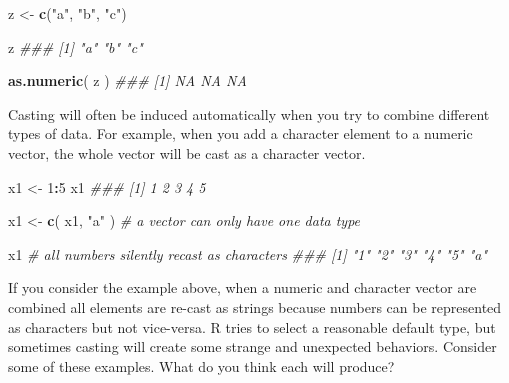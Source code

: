 \documentclass[]{book}
\newenvironment{Shaded}{\begin{snugshade}}{\end{snugshade}}
\newcommand{\CommentTok}[1]{\textcolor[rgb]{0.56,0.35,0.01}{\textit{#1}}}
\newcommand{\DecValTok}[1]{\textcolor[rgb]{0.00,0.00,0.81}{#1}}
\newcommand{\KeywordTok}[1]{\textcolor[rgb]{0.13,0.29,0.53}{\textbf{#1}}}
\newcommand{\NormalTok}[1]{#1}
\newcommand{\OperatorTok}[1]{\textcolor[rgb]{0.81,0.36,0.00}{\textbf{#1}}}
\newcommand{\StringTok}[1]{\textcolor[rgb]{0.31,0.60,0.02}{#1}}
\theoremstyle{definition}
\theoremstyle{definition}
\theoremstyle{definition}
\theoremstyle{remark}
\begin{document}
\begin{Shaded}
\begin{Highlighting}[]

\NormalTok{z <-}\StringTok{ }\KeywordTok{c}\NormalTok{(}\StringTok{"a"}\NormalTok{, }\StringTok{"b"}\NormalTok{, }\StringTok{"c"}\NormalTok{)}

\NormalTok{z}
\CommentTok{### [1] "a" "b" "c"}

\KeywordTok{as.numeric}\NormalTok{( z )}
\CommentTok{### [1] NA NA NA}
\end{Highlighting}
\end{Shaded}

Casting will often be induced automatically when you try to combine
different types of data. For example, when you add a character element
to a numeric vector, the whole vector will be cast as a character
vector.

\begin{Shaded}
\begin{Highlighting}[]

\NormalTok{x1 <-}\StringTok{ }\DecValTok{1}\OperatorTok{:}\DecValTok{5}
\NormalTok{x1}
\CommentTok{### [1] 1 2 3 4 5}

\NormalTok{x1 <-}\StringTok{ }\KeywordTok{c}\NormalTok{( x1, }\StringTok{"a"}\NormalTok{ ) }\CommentTok{# a vector can only have one data type}

\NormalTok{x1 }\CommentTok{# all numbers silently recast as characters}
\CommentTok{### [1] "1" "2" "3" "4" "5" "a"}
\end{Highlighting}
\end{Shaded}

If you consider the example above, when a numeric and character vector
are combined all elements are re-cast as strings because numbers can be
represented as characters but not vice-versa. R tries to select a
reasonable default type, but sometimes casting will create some strange
and unexpected behaviors. Consider some of these examples. What do you
think each will produce?
\end{document}
